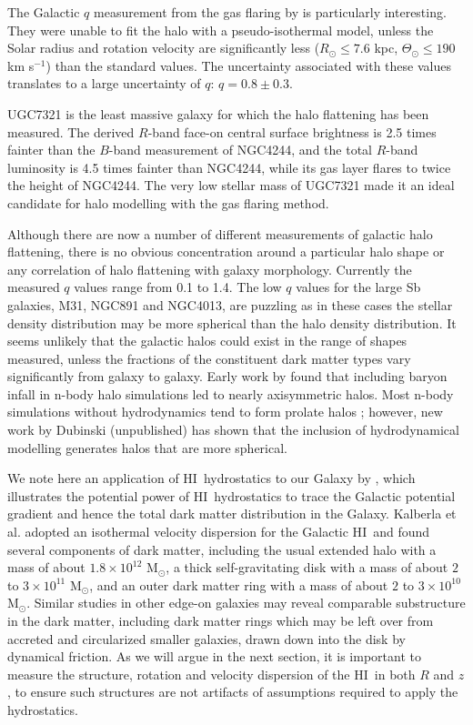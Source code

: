 \documentclass[traditabstract]{aa} %
\newcommand\HI{H{\small I}}
\newcommand\kms{km s$^{-1}$}
\newcommand\msun{M$_{\odot }$}
\begin{document}
The Galactic $q$ measurement from the gas flaring by \citet{om2000} is
particularly interesting. They were unable to fit the
halo with a pseudo-isothermal model, unless the Solar radius and
rotation velocity are significantly less ($R_{\odot}\leq7.6$ kpc,
$\Theta_{\odot}\leq190$ \kms) than the standard values. 
The uncertainty associated with these values translates to a large
uncertainty of $q$: $q=0.8\pm0.3$.

UGC7321 is the least massive galaxy for which the halo flattening has
been measured. The derived $R$-band face-on central surface brightness
is 2.5 times fainter than the $B$-band measurement of NGC4244, and the
total $R$-band luminosity is 4.5 times fainter than NGC4244, while its
gas layer flares to twice the height of NGC4244. The very low stellar
mass of UGC7321 made it an ideal candidate for halo
modelling with the gas flaring method. 

Although there are now a number of different measurements of galactic
halo flattening, there is no obvious concentration around a particular
halo shape or any correlation of halo flattening with galaxy
morphology. Currently the measured $q$ values range from 0.1 to
1.4.  The low $q$ values for the large Sb galaxies, M31,
NGC891 and NGC4013, are puzzling as in these cases the stellar
density distribution may be more spherical than the halo density
distribution. It seems
unlikely that the galactic halos could exist in the range of shapes
measured, unless the fractions of the constituent dark matter types
vary significantly from galaxy to galaxy. Early work by
\citet{dubinski1994} found that including baryon infall in n-body
halo simulations led to nearly axisymmetric halos. Most n-body
simulations without hydrodynamics tend to form prolate halos
\citep{sellwood2004}; however, new work by Dubinski (unpublished)
has shown that the inclusion of hydrodynamical modelling generates
halos that are more spherical.

We note here an application of \HI\ hydrostatics to our Galaxy by
\citet{kdkh07}, which illustrates the potential power of
\HI\ hydrostatics to trace the Galactic potential gradient and hence
the total dark matter distribution in the Galaxy.  Kalberla et al.
adopted an isothermal velocity dispersion for the Galactic \HI\,
and found several components of dark matter, including the usual
extended halo with a mass of about $1.8 \times 10^{12}$ \msun, a
thick self-gravitating disk with a mass of about $2$ to $3 \times
10^{11}$ \msun, and an outer dark matter ring with a mass of about
$2$ to $3 \times 10^{10}$ \msun.  Similar studies in other edge-on
galaxies may reveal comparable substructure in the dark matter,
including dark matter rings which may be left over from accreted
and circularized smaller galaxies, drawn down into the disk by
dynamical friction.  As we will argue in the next section, it is 
important to measure the structure, rotation and velocity
dispersion of the \HI\ in both $R$ and $z$, to ensure such structures
are not artifacts of assumptions required to apply the hydrostatics.
\end{document}
